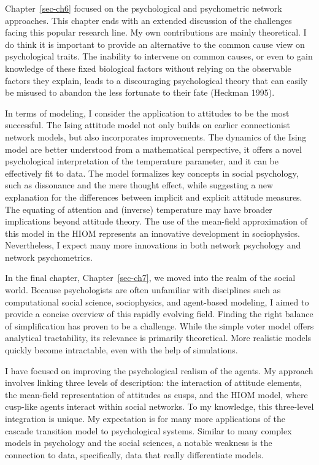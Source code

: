 \documentclass[
  a4paper,
  DIV=11,
  numbers=noendperiod]{scrreprt}
\begin{document}
Chapter~\ref{sec-ch6} focused on the psychological and psychometric
network approaches. This chapter ends with an extended discussion of the
challenges facing this popular research line. My own contributions are
mainly theoretical. I do think it is important to provide an alternative
to the common cause view on psychological traits. The inability to
intervene on common causes, or even to gain knowledge of these fixed
biological factors without relying on the observable factors they
explain, leads to a discouraging psychological theory that can easily be
misused to abandon the less fortunate to their fate (Heckman 1995).

In terms of modeling, I consider the application to attitudes to be the
most successful. The Ising attitude model not only builds on earlier
connectionist network models, but also incorporates improvements. The
dynamics of the Ising model are better understood from a mathematical
perspective, it offers a novel psychological interpretation of the
temperature parameter, and it can be effectively fit to data. The model
formalizes key concepts in social psychology, such as dissonance and the
mere thought effect, while suggesting a new explanation for the
differences between implicit and explicit attitude measures. The
equating of attention and (inverse) temperature may have broader
implications beyond attitude theory. The use of the mean-field
approximation of this model in the HIOM represents an innovative
development in sociophysics. Nevertheless, I expect many more
innovations in both network psychology and network psychometrics.

In the final chapter, Chapter~\ref{sec-ch7}, we moved into the realm of
the social world. Because psychologists are often unfamiliar with
disciplines such as computational social science, sociophysics, and
agent-based modeling, I aimed to provide a concise overview of this
rapidly evolving field. Finding the right balance of simplification has
proven to be a challenge. While the simple voter model offers analytical
tractability, its relevance is primarily theoretical. More realistic
models quickly become intractable, even with the help of simulations.

I have focused on improving the psychological realism of the agents. My
approach involves linking three levels of description: the interaction
of attitude elements, the mean-field representation of attitudes as
cusps, and the HIOM model, where cusp-like agents interact within social
networks. To my knowledge, this three-level integration is unique. My
expectation is for many more applications of the cascade transition
model to psychological systems. Similar to many complex models in
psychology and the social sciences, a notable weakness is the connection
to data, specifically, data that really differentiate models.
\end{document}
